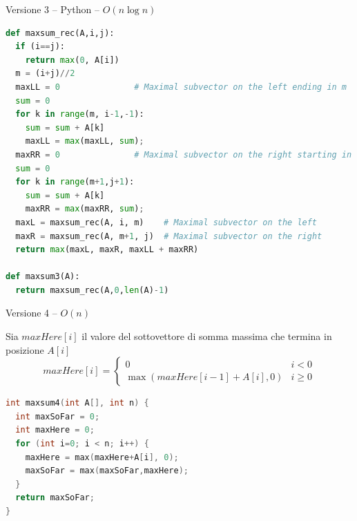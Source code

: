 \begin{frame}[fragile]{Versione 3 -- Python -- $O(n \log n)$}

\footnotesize
\vspace{-12pt}
\begin{lstlisting}[language=python]
def maxsum_rec(A,i,j):
  if (i==j):
    return max(0, A[i])  
  m = (i+j)//2
  maxLL = 0               # Maximal subvector on the left ending in m
  sum = 0
  for k in range(m, i-1,-1):
    sum = sum + A[k]
    maxLL = max(maxLL, sum);
  maxRR = 0               # Maximal subvector on the right starting in m+1
  sum = 0
  for k in range(m+1,j+1):
    sum = sum + A[k]
    maxRR = max(maxRR, sum);
  maxL = maxsum_rec(A, i, m)    # Maximal subvector on the left
  maxR = maxsum_rec(A, m+1, j)  # Maximal subvector on the right
  return max(maxL, maxR, maxLL + maxRR)

def maxsum3(A):
  return maxsum_rec(A,0,len(A)-1)
\end{lstlisting}	



%
  
\end{frame}  


\begin{frame}[fragile]{Versione 4  -- $O(n)$}

\vspace{-6pt}
\begin{myboxtitle}
Sia \alert{$\mathit{maxHere}[i]$} il valore del sottovettore di somma massima che termina in posizione $A[i]$
\begingroup
\small
\[
\mathit{maxHere}[i] = \begin{cases}
  0 & i<0 \\
  \max(\mathit{maxHere}[i-1]+A[i], 0) & i \geq 0
\end{cases}
\]
\endgroup
\vspace{-12pt}
\end{myboxtitle}

\begin{lstlisting}[language=c++]
int maxsum4(int A[], int n) {
  int maxSoFar = 0;
  int maxHere = 0;
  for (int i=0; i < n; i++) {
    maxHere = max(maxHere+A[i], 0);
    maxSoFar = max(maxSoFar,maxHere);
  }  
  return maxSoFar;
}
\end{lstlisting}  
  
\end{frame}  

